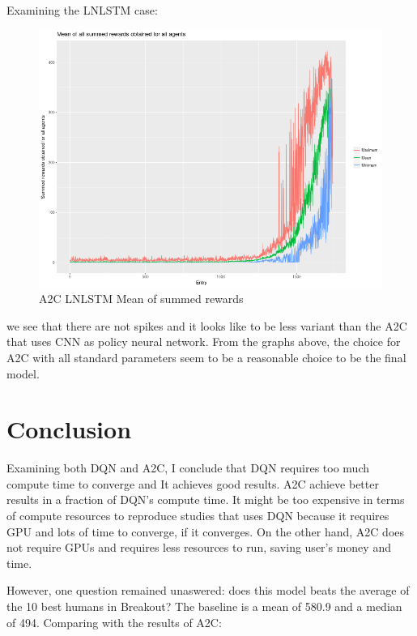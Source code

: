 \documentclass[11pt,twoside,a4paper]{article}
\begin{document}
Examining the LNLSTM case:

\begin{figure}[H]
  \includegraphics[scale=0.35]{log-analysis/a2c-lnlstm-mean-summed-rewards.png}
  \centering
  \caption{A2C LNLSTM Mean of summed rewards}
  \label{fig:a2c-lnlstm-mean-summed-rewards}
\end{figure}

we see that there are not spikes and it looks like to be less variant than the
A2C that uses CNN as policy neural network. From the graphs above, the choice
for A2C with all standard parameters seem to be a reasonable choice to be the
final model.

\section*{Conclusion}

Examining both DQN and A2C, I conclude that DQN requires too much compute time
to converge and It achieves good results. A2C achieve better results in a
fraction of DQN's compute time. It might be too expensive in terms of compute
resources to reproduce studies that uses DQN because it requires GPU and lots of
time to converge, if it converges. On the other hand, A2C does not require GPUs
and requires less resources to run, saving user's money and time.

However, one question remained unaswered: does this model beats the average of
the 10 best humans in Breakout? The baseline is a mean of 580.9 and a median of
494. Comparing with the results of A2C:
\end{document}
